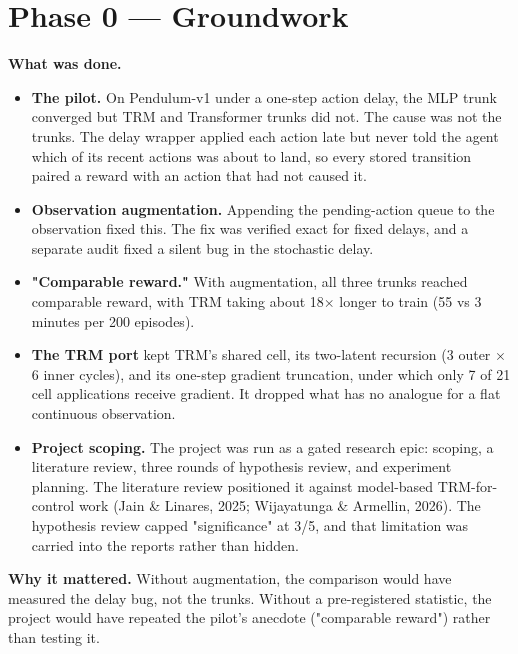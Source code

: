 \documentclass[11pt]{article}
\begin{document}
\medskip



\section*{Phase 0 --- Groundwork}



\textbf{What was done.}

\begin{itemize}
\item \textbf{The pilot.} On Pendulum-v1 under a one-step action delay, the MLP trunk converged but TRM and Transformer trunks did not. The cause was not the trunks. The delay wrapper applied each action late but never told the agent which of its recent actions was about to land, so every stored transition paired a reward with an action that had not caused it.
\item \textbf{Observation augmentation.} Appending the pending-action queue to the observation fixed this. The fix was verified exact for fixed delays, and a separate audit fixed a silent bug in the stochastic delay.
\item \textbf{"Comparable reward."} With augmentation, all three trunks reached comparable reward, with TRM taking about 18$\times$ longer to train (55 vs 3 minutes per 200 episodes).
\item \textbf{The TRM port} kept TRM's shared cell, its two-latent recursion (3 outer $\times$ 6 inner cycles), and its one-step gradient truncation, under which only 7 of 21 cell applications receive gradient. It dropped what has no analogue for a flat continuous observation.
\item \textbf{Project scoping.} The project was run as a gated research epic: scoping, a literature review, three rounds of hypothesis review, and experiment planning. The literature review positioned it against model-based TRM-for-control work (Jain \& Linares, 2025; Wijayatunga \& Armellin, 2026). The hypothesis review capped "significance" at 3/5, and that limitation was carried into the reports rather than hidden.
\end{itemize}



\textbf{Why it mattered.} Without augmentation, the comparison would have measured the delay bug, not the trunks. Without a pre-registered statistic, the project would have repeated the pilot's anecdote ("comparable reward") rather than testing it.
\end{document}
